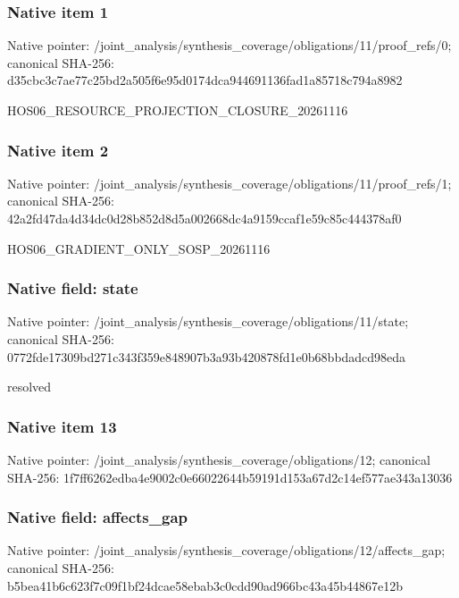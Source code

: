 \documentclass[10pt,a4paper]{article}
\begin{document}
\subsubsection{Native item 1}
Native pointer: /joint\_\allowbreak{}analysis/synthesis\_\allowbreak{}coverage/obligations/11/proof\_\allowbreak{}refs/0; canonical SHA-256: d35cbc3c7ae77c25bd2a505f6e95d0174dca944691136fad1a85718c794a8982

\begingroup\raggedright\sloppy HOS06\_\allowbreak{}RESOURCE\_\allowbreak{}PROJECTION\_\allowbreak{}CLOSURE\_\allowbreak{}20261116\par\endgroup

\subsubsection{Native item 2}
Native pointer: /joint\_\allowbreak{}analysis/synthesis\_\allowbreak{}coverage/obligations/11/proof\_\allowbreak{}refs/1; canonical SHA-256: 42a2fd47da4d34dc0d28b852d8d5a002668dc4a9159ccaf1e59c85c444378af0

\begingroup\raggedright\sloppy HOS06\_\allowbreak{}GRADIENT\_\allowbreak{}ONLY\_\allowbreak{}SOSP\_\allowbreak{}20261116\par\endgroup

\subsubsection{Native field: state}
Native pointer: /joint\_\allowbreak{}analysis/synthesis\_\allowbreak{}coverage/obligations/11/state; canonical SHA-256: 0772fde17309bd271c343f359e848907b3a93b420878fd1e0b68bbdadcd98eda

\begingroup\raggedright\sloppy resolved\par\endgroup

\subsubsection{Native item 13}
Native pointer: /joint\_\allowbreak{}analysis/synthesis\_\allowbreak{}coverage/obligations/12; canonical SHA-256: 1f7ff6262edba4e9002c0e66022644b59191d153a67d2c14ef577ae343a13036

\subsubsection{Native field: affects\_\allowbreak{}gap}
Native pointer: /joint\_\allowbreak{}analysis/synthesis\_\allowbreak{}coverage/obligations/12/affects\_\allowbreak{}gap; canonical SHA-256: b5bea41b6c623f7c09f1bf24dcae58ebab3c0cdd90ad966bc43a45b44867e12b
\end{document}
